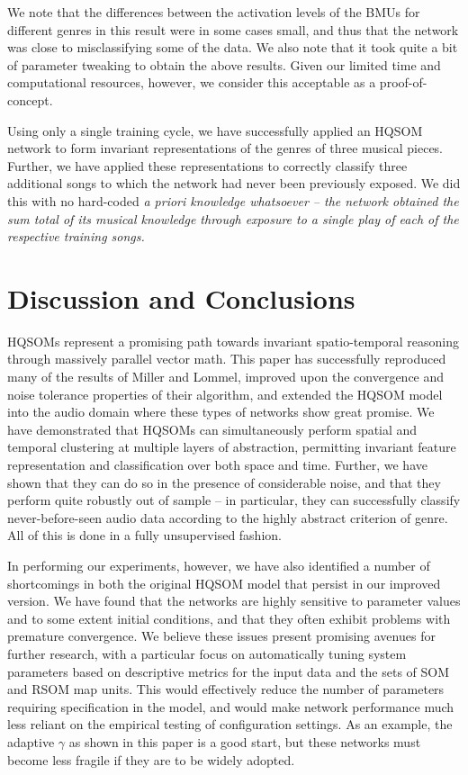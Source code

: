 \documentclass[a4paper,10pt]{article}
\begin{document}
We note that the differences between the activation levels of the BMUs for different genres in this
result were in some cases small, and thus that the network was close to misclassifying some of the
data.  We also note that it took quite a bit of parameter tweaking to obtain the above results. 
Given our limited time and computational resources, however, we consider this acceptable as a
proof-of-concept.

Using only a single training cycle, we have successfully applied an HQSOM network to form invariant
representations of the genres of three musical pieces.  Further, we have applied these
representations to correctly classify three additional songs to which the network had never been
previously exposed.  We did this with no hard-coded \em a priori \em knowledge whatsoever -- the
network obtained the sum total of its musical knowledge through exposure to a single play of each of
the respective training songs.

\section{Discussion and Conclusions}

HQSOMs represent a promising path towards invariant spatio-temporal reasoning through massively
parallel vector math. This paper has successfully reproduced many of the results of Miller and
Lommel, improved upon the convergence and noise tolerance properties of their algorithm, and
extended the HQSOM model into the audio domain where these types of networks show great promise. We
have demonstrated that HQSOMs can simultaneously perform spatial and temporal clustering at multiple
layers of abstraction, permitting invariant feature representation and classification over both
space and time. Further, we have shown that they can do so in the presence of considerable noise,
and that they perform quite robustly out of sample -- in particular, they can successfully classify
never-before-seen audio data according to the highly abstract criterion of genre. All of this is
done in a fully unsupervised fashion.

In performing our experiments, however, we have also identified a number of shortcomings in both the
original HQSOM model that persist in our improved version. We have found that the networks are
highly sensitive
to parameter values and to some extent initial conditions, and that they often exhibit problems with
premature convergence. We believe these issues present promising avenues for further research, with
a particular focus on automatically tuning system parameters based on descriptive metrics for the
input data and the sets of SOM and RSOM map units. This would effectively reduce the number of
parameters
requiring specification in the model, and would make network performance much less reliant on the 
empirical testing of configuration settings. As an example, the adaptive $\gamma$ as shown in this
paper is a good start, but these networks must become less fragile if they are to be widely adopted.
\end{document}
